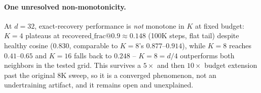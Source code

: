 \paragraph{One unresolved non-monotonicity.} At $d{=}32$, exact-recovery
performance is \emph{not} monotone in $K$ at fixed budget: $K{=}4$
plateaus at $\mathrm{recovered\_frac@0.9}\approx0.148$ (100K steps, flat
tail) despite healthy cosine ($0.830$, comparable to $K{=}8$'s
$0.877$--$0.914$), while $K{=}8$ reaches $0.41$--$0.65$ and $K{=}16$ falls
back to $0.248$ -- $K{=}8=d/4$ outperforms both neighbors in the tested
grid. This survives a $5\times$ and then $10\times$ budget extension past
the original 8K sweep, so it is a converged phenomenon, not an
undertraining artifact, and it remains open and unexplained.
